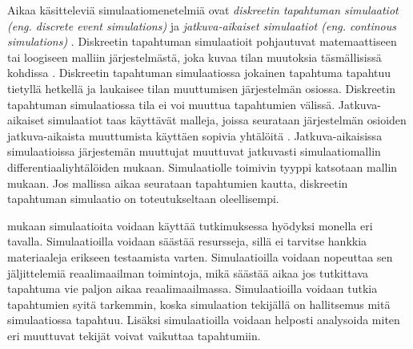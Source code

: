 \documentclass[utf8]{gradu3}
\begin{document}
Aikaa käsitteleviä simulaatiomenetelmiä ovat 
\textit{diskreetin tapahtuman simulaatiot (eng. discrete event simulations)}
ja \textit{jatkuva-aikaiset simulaatiot  (eng. continous simulations)}
\parencite{historyOfSimulation1996}.
Diskreetin tapahtuman simulaatioit pohjautuvat matemaattiseen tai loogiseen
malliin järjestelmästä, joka kuvaa tilan muutoksia täsmällisissä kohdissa
\parencite{historyOfSimulation1996}. 
Diskreetin tapahtuman simulaatiossa jokainen tapahtuma tapahtuu tietyllä 
hetkellä ja laukaisee tilan muuttumisen järjestelmän osiossa.
Diskreetin tapahtuman simulaatiossa  tila ei voi muuttua tapahtumien välissä.
Jatkuva-aikaiset simulaatiot taas käyttävät malleja, joissa seurataan 
järjestelmän osioiden jatkuva-aikaista muuttumista käyttäen sopivia 
yhtälöitä \parencite{historyOfSimulation1996}. 
Jatkuva-aikaisissa simulaatioissa järjestemän muuttujat muuttuvat 
jatkuvasti simulaatiomallin differentiaaliyhtälöiden mukaan.
Simulaatiolle toimivin tyyppi katsotaan mallin mukaan. Jos mallissa aikaa seurataan 
tapahtumien kautta, diskreetin tapahtuman simulaatio on toteutukseltaan oleellisempi.

\cite{banks1999introduction} mukaan simulaatioita voidaan 
käyttää tutkimuksessa hyödyksi monella eri tavalla.
Simulaatioilla voidaan säästää resursseja, sillä ei tarvitse hankkia materiaaleja erikseen testaamista varten. 
Simulaatioilla voidaan nopeuttaa sen jäljittelemiä reaalimaailman toimintoja,
mikä säästää aikaa jos tutkittava tapahtuma vie paljon aikaa reaalimaailmassa. Simulaatioilla voidaan tutkia tapahtumien syitä tarkemmin, koska simulaation tekijällä on hallitsemus mitä simulaatiossa tapahtuu.
Lisäksi simulaatioilla voidaan helposti analysoida miten eri muuttuvat tekijät voivat vaikuttaa tapahtumiin. 
\end{document}

